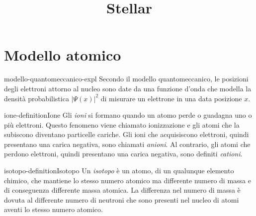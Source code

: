 \documentclass[preview]{standalone}
\begin{document}
\title{Stellar}
\genpage

\section{Modello atomico}


\begin{snippet}{modello-quantomeccanico-expl}
    Secondo il modello quantomeccanico, le posizioni degli elettroni
    attorno al nucleo sono date da una funzione d'onda che modella la densità
    probabilistica \({|\Psi(x)|}^2\) di misurare un elettrone in una data posizione \(x\).
\end{snippet}

\begin{snippetdefinition}{ione-definition}{Ione}
    Gli \textit{ioni} si formano quando un atomo perde o guadagna uno o più elettroni.
    Questo fenomeno viene chiamato ionizzazione e gli atomi che la subiscono diventano
    particelle cariche.
    Gli ioni che acquisiscono elettroni, quindi presentano una carica negativa, sono chiamati
    \textit{anioni}.
    Al contrario, gli atomi che perdono elettroni, quindi presentano
    una carica negativa, sono definiti \textit{cationi}.
\end{snippetdefinition}

\begin{snippetdefinition}{isotopo-definition}{Isotopo}
    Un \textit{isotopo} è un atomo, di un qualunque elemento chimico, che mantiene
    lo stesso numero atomico ma differente numero di massa e di conseguenza differente massa atomica.
    La differenza nel numero di massa è dovuta al differente numero di neutroni che sono presenti nel
    nucleo di atomi aventi lo stesso numero atomico.
\end{snippetdefinition}
\end{document}
